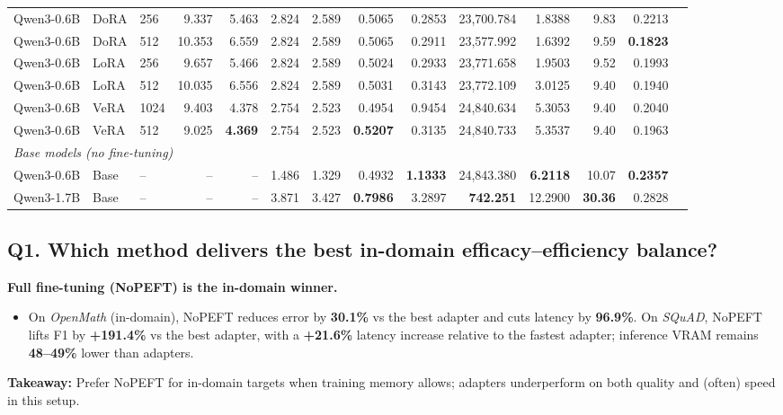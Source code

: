 \documentclass[11pt,a4paper]{article}
\begin{document}
\begin{table}[H]
\begin{adjustbox}{max width=\textwidth}
\begin{tabular}{lll rrrrr r rr r rr}
Qwen3-0.6B & DoRA   & 256  & 9.337 & 5.463 & 2.824 & 2.589 & 0.5065 & 0.2853 & 23{,}700.784 & 1.8388 & 9.83 & 0.2213 \\
Qwen3-0.6B & DoRA   & 512  & 10.353 & 6.559 & 2.824 & 2.589 & 0.5065 & 0.2911 & 23{,}577.992 & 1.6392 & 9.59 & \textbf{0.1823} \\
Qwen3-0.6B & LoRA   & 256  & 9.657 & 5.466 & 2.824 & 2.589 & 0.5024 & 0.2933 & 23{,}771.658 & 1.9503 & 9.52 & 0.1993 \\
Qwen3-0.6B & LoRA   & 512  & 10.035 & 6.556 & 2.824 & 2.589 & 0.5031 & 0.3143 & 23{,}772.109 & 3.0125 & 9.40 & 0.1940 \\
Qwen3-0.6B & VeRA   & 1024 & 9.403 & 4.378 & 2.754 & 2.523 & 0.4954 & 0.9454 & 24{,}840.634 & 5.3053 & 9.40 & 0.2040 \\
Qwen3-0.6B & VeRA   & 512  & 9.025 & \textbf{4.369} & 2.754 & 2.523 & \textbf{0.5207} & 0.3135 & 24{,}840.733 & 5.3537 & 9.40 & 0.1963 \\
\midrule
\multicolumn{13}{l}{\textit{Base models (no fine-tuning)}} \\
Qwen3-0.6B & Base   & --   & --    & --    & 1.486 & 1.329 & 0.4932 & \textbf{1.1333} & 24{,}843.380 & \textbf{6.2118} & 10.07 & \textbf{0.2357} \\
Qwen3-1.7B & Base   & --   & --    & --    & 3.871 & 3.427 & \textbf{0.7986} & 3.2897 & \textbf{742.251} & 12.2900 & \textbf{30.36} & 0.2828 \\
\bottomrule
\end{tabular}
\end{adjustbox}
\end{table}

\subsection*{Q1. Which method delivers the best in-domain efficacy–efficiency balance?}
\textbf{Full fine-tuning (NoPEFT) is the in-domain winner.}
\begin{itemize}
  \item On \textit{OpenMath} (in-domain), NoPEFT reduces error by \textbf{30.1\%} vs the best adapter and cuts latency by \textbf{96.9\%}. On \textit{SQuAD}, NoPEFT lifts F1 by \textbf{+191.4\%} vs the best adapter, with a \textbf{+21.6\%} latency increase relative to the fastest adapter; inference VRAM remains \textbf{48--49\%} lower than adapters.
\end{itemize}
\textbf{Takeaway:} Prefer NoPEFT for in-domain targets when training memory allows; adapters underperform on both quality and (often) speed in this setup.
\end{document}
